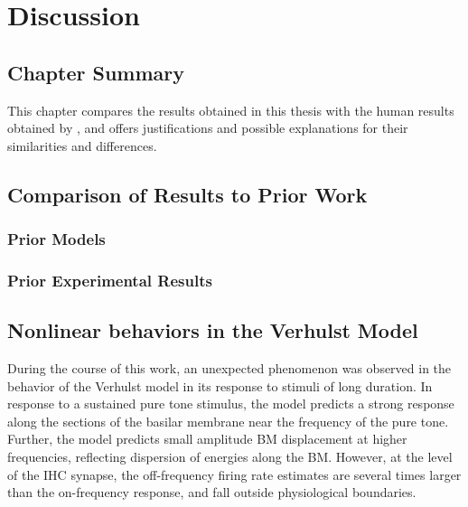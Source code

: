 \chapter{Discussion}
\label{chapter:Discussion}
\thispagestyle{myheadings}

\graphicspath{{6_Discussion/Figures/}}
\section{Chapter Summary} %
\label{sec:discussion_summary}
This chapter compares the results obtained in this thesis with the human results obtained by \citeauthor{Mehraei2016Auditory}, and offers justifications and possible explanations for their similarities and differences.

\section{Comparison of Results to Prior Work} %
\label{sec:comparison_of_results_to_prior_work}
\subsection{Prior Models} %
\label{sub:prior_models}

\subsection{Prior Experimental Results} %
\label{sub:prior_experimental_results}


\section{Nonlinear behaviors in the Verhulst Model} %
\label{sec:nonlinear_behaviors_in_the_verhulst_model}
During the course of this work, an unexpected phenomenon was observed in the behavior of the Verhulst model in its response to stimuli of long duration.  In response to a sustained pure tone stimulus, the model predicts a strong response along the sections of the basilar membrane near the frequency of the pure tone.  Further, the model predicts small amplitude BM displacement at higher frequencies, reflecting dispersion of energies along the BM.  However, at the level of the IHC synapse, the off-frequency firing rate estimates are several times larger than the on-frequency response, and fall outside physiological boundaries.   

